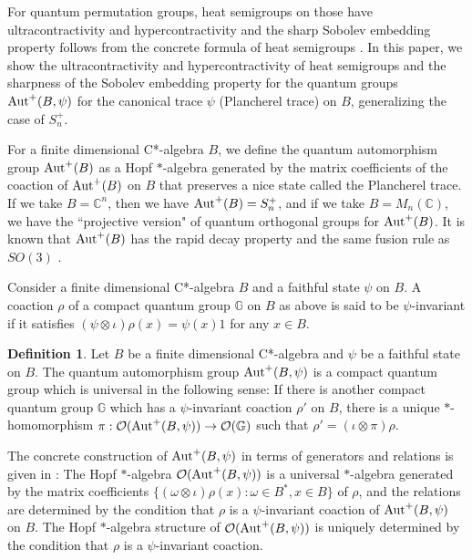 \documentclass[12pt]{amsart}
\theoremstyle{plain} %
\theoremstyle{definition}
\newtheorem{definition}[equation]{Definition}
\theoremstyle{remark}
\begin{document}
For quantum permutation groups, heat semigroups on those have ultracontractivity and hypercontractivity \cite{FHLUZ} and the sharp Sobolev embedding property follows from the concrete formula of heat semigroups \cite{You20}. 
In this paper, we show the ultracontractivity and hypercontractivity of heat semigroups and the sharpness of the Sobolev embedding property for the quantum groups ${\rm Aut}^+(B,\psi)$ for the canonical trace $\psi$ (Plancherel trace) on $B$, generalizing the case of $S_n^+$. 

For a finite dimensional C*-algebra $B$, we define the quantum automorphism group ${\rm Aut}^+(B)$ as a Hopf $*$-algebra generated by the matrix coefficients of the coaction of ${\rm Aut}^+(B)$ on $B$ that preserves a nice state called the Plancherel trace. 
If we take $B=\mathbb{C}^n$, then we have ${\rm Aut}^+(B)=S_n^+$, and if we take $B=M_n(\mathbb{C})$, we have the ``projective version" of quantum orthogonal groups for ${\rm Aut}^+(B)$.
It is known that ${\rm Aut}^+(B)$ has the rapid decay property \cite{Bra13} and the same fusion rule as $SO(3)$ \cite{Ban99}.

Consider a finite dimensional C*-algebra $B$ and a faithful state $\psi$ on $B$.
A coaction $\rho$ of a compact quantum group $\mathbb{G}$ on $B$ as above is said to be $\psi$-invariant if it satisfies $(\psi\otimes\iota)\rho(x)=\psi(x)1$ for any $x\in B$.


\begin{definition}
Let $B$ be a finite dimensional C*-algebra and $\psi$ be a faithful state on $B$.
The quantum automorphism group ${\rm Aut}^+(B, \psi)$ is a compact quantum group which is universal in the following sense: 
If there is another compact quantum group $\mathbb{G}$ which has a $\psi$-invariant coaction $\rho'$ on $B$, there is a unique $*$-homomorphism $\pi:\mathcal{O}({\rm Aut}^+(B, \psi))\to\mathcal{O}(\mathbb{G})$ such that $\rho'=(\iota\otimes\pi)\rho$.
\end{definition}

The concrete construction of ${\rm Aut}^+(B, \psi)$ in terms of generators and relations is given in \cite{Wan98}: The Hopf $*$-algebra $\mathcal{O}({\rm Aut}^+(B, \psi))$ is a universal $*$-algebra generated by the matrix coefficients $\{(\omega\otimes\iota)\rho(x):\omega\in B^*, x\in B\}$ of $\rho$, and the relations are determined by the condition that $\rho$ is a $\psi$-invariant coaction of ${\rm Aut}^+(B, \psi)$ on $B$. The Hopf $*$-algebra structure of $\mathcal{O}({\rm Aut}^+(B, \psi))$ is uniquely determined by the condition that $\rho$ is a $\psi$-invariant coaction. 
\end{document}
